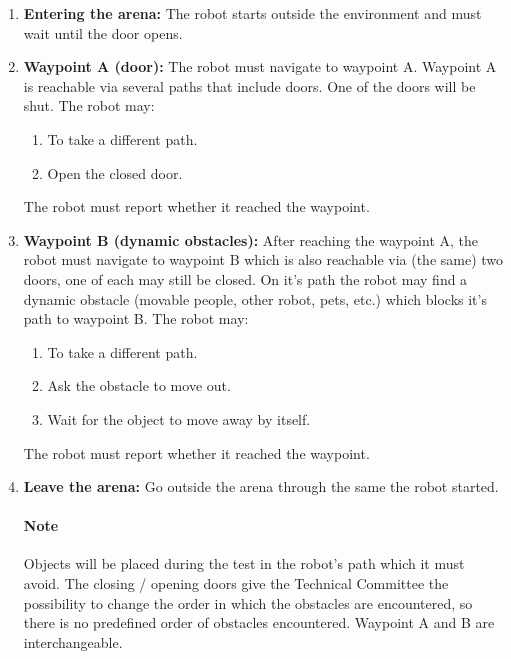 \begin{enumerate}
\item \textbf{Entering the arena:} The robot starts outside the environment and must wait until the door opens.
\item \textbf{Waypoint A (door):} The robot must navigate to waypoint A. Waypoint A is reachable via several paths that include doors. One of the doors will be shut. The robot may:
\begin{enumerate}
\item To take a different path.
\item Open the closed door.
\end{enumerate}
The robot must report whether it reached the waypoint.

\item \textbf{Waypoint B (dynamic obstacles):} After reaching the waypoint A, the robot must navigate to waypoint B which is also reachable via (the same) two doors, one of each may still be closed. On it's path the robot may find a dynamic obstacle (movable people, other robot, pets, etc.) which blocks it's path to waypoint B. The robot may:
\begin{enumerate}
\item To take a different path.
\item Ask the obstacle to move out.
\item Wait for the object to move away by itself.
\end{enumerate}
The robot must report whether it reached the waypoint.
\item \textbf{Leave the arena:} Go outside the arena through the same the robot started.

\paragraph{Note} Objects will be placed during the test in the robot's path which it must avoid. The closing / opening doors give the Technical Committee the possibility to change the order in which the obstacles are encountered, so there is no predefined order of obstacles encountered. Waypoint A and B are interchangeable.
\end{enumerate}

